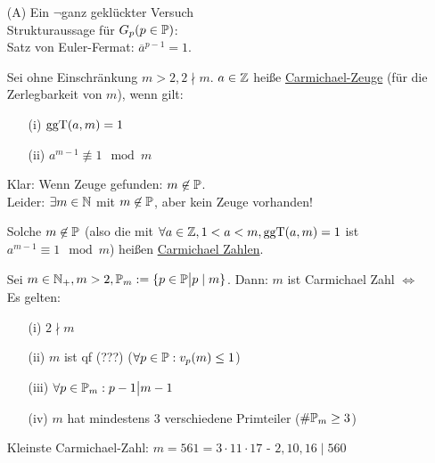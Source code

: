 \documentclass[a4paper,DIV15,BCOR12mm]{article}
\begin{document}
\begin{itemize}
 \item[(A)] Ein $\neg$ganz geklückter Versuch\\
  Strukturaussage für $G_p (p \in \mathbb{P})$:\\
  Satz von Euler-Fermat: $\overline a^{p-1} = 1$.
  \begin{definition}
   Sei ohne Einschränkung $m > 2, 2 \nmid m$. $a \in \mathbb{Z}$ heiße \underline{Carmichael-Zeuge} (für die Zerlegbarkeit von $m$), wenn gilt:
    \begin{itemize}
     \item[(i)] $\mathop{\rm ggT}\nolimits (a,m) = 1$
     \item[(ii)] $a^{m-1} \not\equiv 1 \mod m$
    \end{itemize}
  \end{definition}
  Klar: Wenn Zeuge gefunden: $m \not\in \mathbb{P}$.\\
  Leider: $\exists m \in \mathbb{N}$ mit $m \not\in \mathbb{P}$, aber kein Zeuge vorhanden!
  \begin{definition}
   Solche $m \not\in \mathbb{P}$ (also die mit $\forall a \in \mathbb{Z}, 1 < a < m, \mathop{\rm ggT}\nolimits (a,m) = 1$ ist $a^{m-1} \equiv 1 \mod m$) heißen \underline{Carmichael Zahlen}.
  \end{definition}
  \begin{satz}
   Sei $m \in \mathbb{N}_+, m > 2, \mathbb{P}_m := \{p \in \mathbb{P} \big| p \mid m\}$. Dann: $m$ ist Carmichael Zahl $\Leftrightarrow$ Es gelten:
    \begin{itemize}
     \item[(i)] $2 \nmid m$
     \item[(ii)] $m$ ist qf (???) ($\forall p \in \mathbb{P}: v_p(m) \le 1$)
     \item[(iii)] $\forall p \in \mathbb{P}_m: p-1 \big| m-1$
     \item[(iv)] $m$ hat mindestens 3 verschiedene Primteiler ($\#\mathbb{P}_m \ge 3$)
    \end{itemize}
  \end{satz}
  \begin{beispiel}
   Kleinste Carmichael-Zahl: $m = 561 = 3 \cdot 11 \cdot 17$ - $2,10,16 \mid 560$
  \end{beispiel}
  \begin{beweis}
\end{beweis}
\end{itemize}
\end{document}
